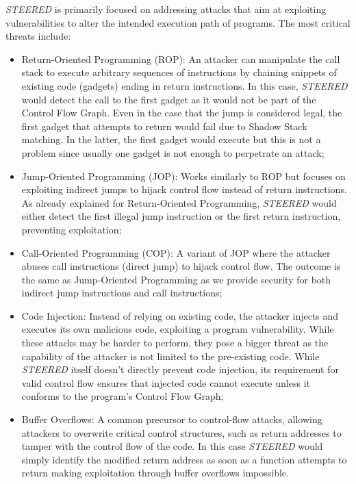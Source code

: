 \textit{STEERED} is primarily focused on addressing attacks that aim at exploiting
vulnerabilities to alter the intended execution path of programs. The most
critical threats include:
\begin{itemize}
  \item Return-Oriented Programming (ROP): An attacker can manipulate the call
    stack to execute arbitrary sequences of instructions by chaining snippets of
    existing code (gadgets) ending in return instructions. In this case, \textit{STEERED}
    would detect the call to the first gadget as it would not be part of the Control
    Flow Graph. Even in the case that the jump is considered legal, the first gadget
    that attempts to return would fail due to Shadow Stack matching. In the
    latter, the first gadget would execute but this is not a problem since usually
    one gadget is not enough to perpetrate an attack;

  \item Jump-Oriented Programming (JOP): Works similarly to ROP but focuses on
    exploiting indirect jumps to hijack control flow instead of return
    instructions. As already explained for Return-Oriented Programming, \textit{STEERED}
    would either detect the first illegal jump instruction or the first return instruction,
    preventing exploitation;

  \item Call-Oriented Programming (COP): A variant of JOP where the attacker
    abuses call instructions (direct jump) to hijack control flow. The outcome is
    the same as Jump-Oriented Programming as we provide security for both indirect
    jump instructions and call instructions;

  \item Code Injection: Instead of relying on existing code, the attacker injects
    and executes its own malicious code, exploiting a program vulnerability. While
    these attacks may be harder to perform, they pose a bigger threat as the
    capability of the attacker is not limited to the pre-existing code. While \textit{STEERED}
    itself doesn't directly prevent code injection, its requirement for valid control
    flow ensures that injected code cannot execute unless it conforms to the program's
    Control Flow Graph;

  \item Buffer Overflows: A common precursor to control-flow attacks, allowing attackers
    to overwrite critical control structures, such as return addresses to tamper
    with the control flow of the code. In this case \textit{STEERED} would
    simply identify the modified return address as soon as a function attempts
    to return making exploitation through buffer overflows impossible.
\end{itemize}


